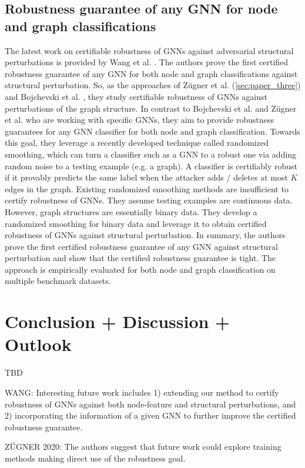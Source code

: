 \documentclass[a4paper,preprint]{sig-alternate}
\begin{document}
\subsection{Robustness guarantee of any GNN for node and graph classifications}
\label{sec:paper_four}

The latest work on certifiable robustness of GNNs against adversarial structural perturbations is provided by Wang et al. \cite{wang2020certified}.
The authors prove the first certified robustness guarantee of any GNN for both node and graph classifications against structural perturbation.
So, as the approaches of Zügner et al. (\ref{sec:paper_three}) and Bojchevski et al. \cite{bojchevski2019certifiable}, they study certifiable 
robustness of GNNs against perturbations of the graph structure. In contrast to Bojchevski et al. and Zügner et al. who are working with specific GNNs,
they aim to provide robustness guarantees for any GNN classifier for both node and graph classification. 
Towards this goal, they leverage a recently developed technique called randomized smoothing, which can turn a classifier such as a GNN to 
a robust one via adding random noise to a testing example (e.g. a graph). A classifier is certifiably robust if it provably predicts the
same label when the attacker adds / deletes at most $K$ edges in the graph.\newline
Existing randomized smoothing methods are insufficient to certify robustness of GNNs. They assume testing examples are continuous data.
However, graph structures are essentially binary data. They develop a randomized smoothing for binary data and leverage it to obtain
certified robustness of GNNs against structural perturbation.\newline
In summary, the authors prove the first certified robustness guarantee of any GNN against structural perturbation and show that the certified
robustness guarantee is tight. The approach is empirically evaluated for both node and graph classification on multiple benchmark datasets.\newline

\vfill
\pagebreak

\section{Conclusion + Discussion + Outlook}
\label{sec:conclusion}
TBD

WANG:
Interesting future work includes 1) extending our method to certify robustness of GNNs against both node-feature
and structural perturbations, and 2) incorporating the information of a given GNN to further improve the certified robustness guarantee.\newline

ZÜGNER 2020:
The authors suggest that future work could explore training methods making direct use of the robustness goal.

\vfill
\pagebreak



\end{document}
